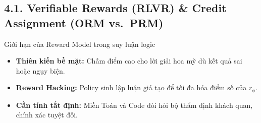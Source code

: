 
\subsection{4.1. Verifiable Rewards (RLVR) \& Credit Assignment (ORM vs.\ PRM)}

\begin{frame}{Giới hạn của Reward Model trong suy luận logic}
  \small
  \begin{itemize}\setlength{\itemsep}{6pt}
    \item \textbf{Thiên kiến bề mặt:} Chấm điểm cao cho lời giải hoa mỹ dù kết quả sai hoặc ngụy biện.
    \item \textbf{Reward Hacking:} Policy sinh lập luận giả tạo để tối đa hóa điểm số của $r_\phi$.
    \item \textbf{Cần tính tất định:} Miền Toán và Code đòi hỏi bộ thẩm định khách quan, chính xác tuyệt đối.
  \end{itemize}
  \par\vspace{0pt}
\end{frame}

